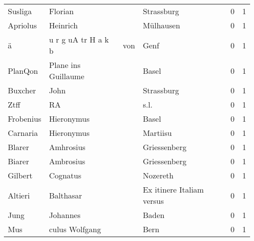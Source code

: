 \begin{center}
\begin{tiny}
\begin{longtabu}{llllrr}
                  Susliga &                            Florian &             &                                  Strassburg &          0 &         1 \\
                 Apriolus &                           Heinrich &             &                                   Mülhausen &          0 &         1 \\
                        ä &                u r g uA tr H a k b &         von &                                        Genf &          0 &         1 \\
                  PlanQon &                Plane ins Guillaume &             &                                       Basel &          0 &         1 \\
                  Buxcher &                               John &             &                                  Strassburg &          0 &         1 \\
                     Ztff &                                 RA &             &                                        s.l. &          0 &         1 \\
                Frobenius &                         Hieronymus &             &                                       Basel &          0 &         1 \\
                 Carnaria &                         Hieronymus &             &                                    Martiisu &          0 &         1 \\
                   Blarer &                          Amhrosius &             &                                Griessenberg &          0 &         1 \\
                   Biarer &                          Ambrosius &             &                                Griessenberg &          0 &         1 \\
                  Gilbert &                           Cognatus &             &                                    Nozereth &          0 &         1 \\
                  Altieri &                          Balthasar &             &                   Ex itinere Italiam versus &          0 &         1 \\
                     Jung &                           Johannes &             &                                       Baden &          0 &         1 \\
                      Mus &                     culus Wolfgang &             &                                        Bern &          0 &         1 \\

\end{longtabu}
\end{tiny}
\end{center}
